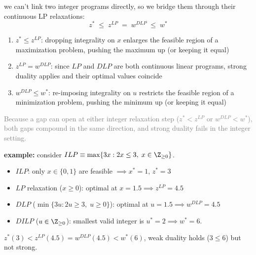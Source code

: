 \documentclass[a4paper, 11pt]{report}
\begin{document}
we can't link two integer programs directly, so we bridge them through their continuous LP relaxations:
$$ z^* \;\leq\; z^{LP} \;=\; w^{DLP} \;\leq\; w^* $$
\begin{enumerate}
    \item $z^* \leq z^{LP}$: dropping integrality on $x$ enlarges the feasible region of a maximization problem, pushing the maximum up (or keeping it equal)
    \item $z^{LP} = w^{DLP}$: since $LP$ and $DLP$ are both continuous linear programs, strong duality applies and their optimal values coincide
    \item $w^{DLP} \leq w^*$: re-imposing integrality on $u$ restricts the feasible region of a minimization problem, pushing the minimum up (or keeping it equal)
\end{enumerate}
\textcolor{gray}{Because a gap can open at either integer relaxation step ($z^* < z^{LP}$ or $w^{DLP} < w^*$), both gaps compound in the same direction, and strong duality fails in the integer setting.}

\textbf{example:} consider $ILP \equiv \max \{ 3x : 2x \leq 3, \; x \in \Z_{\geq 0} \}$.
\begin{itemize}
    \item $ILP$: only $x \in \{0,1\}$ are feasible $\implies x^* = 1$, $z^* = 3$
    \item $LP$ relaxation ($x \geq 0$): optimal at $x = 1.5 \implies z^{LP} = 4.5$
    \item $DLP$ ($\min \{ 3u : 2u \geq 3, \; u \geq 0 \}$): optimal at $u = 1.5 \implies w^{DLP} = 4.5$
    \item $DILP$ ($u \in \Z_{\geq 0}$): smallest valid integer is $u^* = 2 \implies w^* = 6$.
\end{itemize}
 $z^*(3) < z^{LP}(4.5) = w^{DLP}(4.5) < w^*(6)$, weak duality holds ($3 \leq 6$) but not strong.
\end{document}
